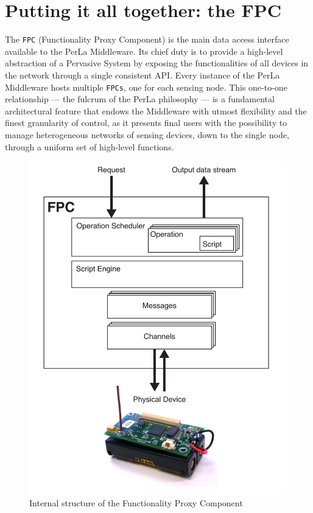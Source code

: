 \section{Putting it all together: the FPC}

The \texttt{FPC} (Functionality Proxy Component) is the main data access
interface available to the PerLa Middleware. Its chief duty is to provide a
high-level abstraction of a Pervasive System by exposing the functionalities of
all devices in the network through a single consistent API. Every instance of
the PerLa Middleware hosts multiple \texttt{FPCs}, one for each sensing node.
This one-to-one relationship --- the fulcrum of the PerLa philosophy --- is a
fundamental architectural feature that endows the Middleware with utmost
flexibility and the finest granularity of control, as it presents final users
with the possibility to manage heterogeneous networks of sensing devices, down
to the single node, through a uniform set of high-level functions.

\begin{figure}[h!]
\includegraphics[width=\textwidth]{imgs/fpc.pdf}
\caption{Internal structure of the Functionality Proxy Component}
\label{fig:fpc}
\end{figure}

